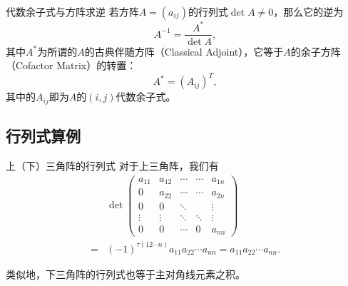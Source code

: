 
\begin{frame}

\begin{block}{代数余子式与方阵求逆}
若方阵$A = (a_{ij})$的行列式$\det A \neq 0$，那么它的逆为
\[A^{-1} = \dfrac{A^*}{\det A},\]
其中$A^*$为所谓的$A$的古典伴随方阵（Classical Adjoint），它等于$A$的余子方阵（Cofactor Matrix）的转置：
\[A^* = (A_{ij})^T,\]
其中的$A_{ij}$即为$A$的$(i,j)$代数余子式。
\end{block}

\end{frame}


\subsection{行列式算例}


\begin{frame}

\begin{block}{上（下）三角阵的行列式}
对于上三角阵，我们有
\[
\begin{aligned}
& \det \begin{pmatrix}
a_{11} & a_{12} & \cdots & \cdots & a_{1n} \\ 0 & a_{22} & \cdots & \cdots & a_{2n} \\ 0 & 0 & \ddots & & \vdots \\ \vdots & \vdots & \ddots & \ddots & \vdots \\ 0 & 0 & \cdots & 0 & a_{nn} \end{pmatrix} \\
= & (-1)^{\tau(12\cdots n)}a_{11}a_{22}\cdots a_{nn} = a_{11}a_{22}\cdots a_{nn}.
\end{aligned}
\]

\vspace{1em}
\pause

类似地，下三角阵的行列式也等于主对角线元素之积。
\end{block}

\end{frame}


